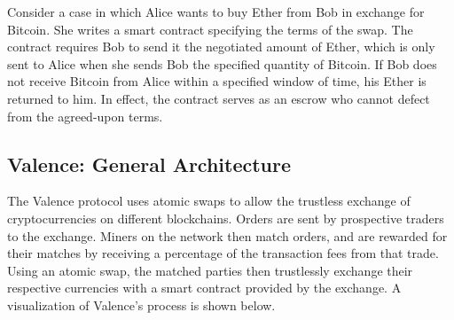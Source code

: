 \documentclass[a4paper]{article}
\begin{document}
            Consider a case in which Alice wants to buy Ether from
            Bob in exchange for Bitcoin. She writes a smart contract
            specifying the terms of the swap. The contract requires
            Bob to send it the negotiated amount of Ether, which is
            only sent to Alice when she sends Bob the specified
            quantity of Bitcoin. If Bob does not receive Bitcoin from
            Alice within a specified window of time, his Ether is
            returned to him. In effect, the contract serves as
            an escrow who cannot defect from the agreed-upon terms.
  	\subsection*{Valence: General Architecture}
    	The Valence protocol uses atomic swaps to allow the trustless
        exchange of cryptocurrencies on different blockchains. Orders
        are sent by prospective traders to the exchange. Miners on
        the network then match orders, and are rewarded for their
        matches by receiving a percentage of the transaction fees from
				that trade. Using an atomic swap, the
        matched parties then trustlessly exchange their respective
        currencies with a smart contract provided by the exchange.
        A visualization of Valence's process is shown below.
\end{document}
